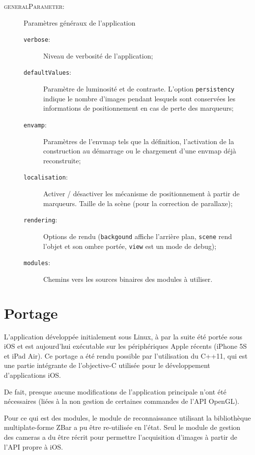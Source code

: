 \documentclass[10pt,a4paper,twoside, twocolumn]{report}
\begin{document}
\begin{description}
	\item[\textsc{generalParameter}:]		Paramètres généraux de l'application
		\begin{description}
			\item[\texttt{verbose}:]				Niveau de verbosité de l'application;
			\item[\texttt{defaultValues}:]	Paramètre de luminosité et de contraste. L’option \texttt{persistency} indique le nombre d'images pendant lesquels sont conservées les informations de positionnement en cas de perte des marqueurs;
			\item[\texttt{envamp}:]					Paramètres de l'envmap tels que la définition, l'activation de la construction au démarrage ou le chargement d'une envmap déjà reconstruite;
			\item[\texttt{localisation}:]		Activer / désactiver les mécanisme de positionnement à partir de marqueurs. Taille de la scène (pour la correction de parallaxe);
			\item[\texttt{rendering}:]			Options de rendu (\texttt{backgound} affiche l’arrière plan, \texttt{scene} rend l'objet et son ombre portée, \texttt{view} est un mode de debug);
			\item[\texttt{modules}:]				Chemins vers les sources binaires des modules à utiliser.
		\end{description}
		
\end{description}




\section{Portage}

L'application développée initialement sous Linux, à par la suite été portée sous iOS et est aujourd'hui exécutable sur les périphériques Apple récents (iPhone 5S et iPad Air). Ce portage a été rendu possible par l'utilisation du C++11, qui est une partie intégrante de l'objective-C utilisée pour le développement d'applications iOS.

De fait, presque aucune modifications de l'application principale n'ont été nécessaires (liées à la non gestion de certaines commandes de l'API OpenGL).

Pour ce qui est des modules, le module de reconnaissance utilisant la bibliothèque multiplate-forme ZBar a pu être re-utilisée en l'état. Seul le module de gestion des cameras a du être récrit pour permettre l’acquisition d'images à partir de l'API propre à iOS.
\end{document}
